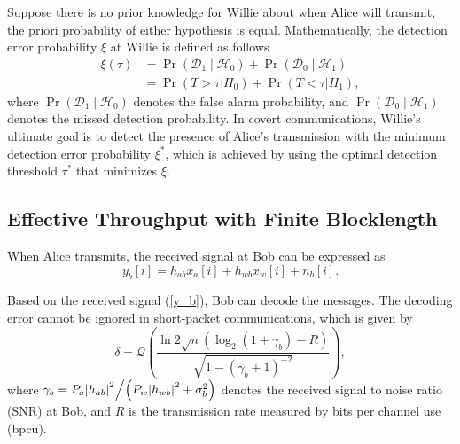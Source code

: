 \documentclass[conference]{IEEEtran}
\begin{document}
Suppose there is no prior knowledge for Willie about when Alice will transmit, the priori probability of either hypothesis is equal. Mathematically,
the detection error probability $\xi$ at Willie is defined as follows \cite{Nmin,Active2,Active3,DF}
\begin{equation}\label{Pd}
	\begin{aligned}
	\xi \left( \tau  \right)&={\Pr}\left(\mathcal{D}_1 \mid \mathcal{H}_0\right)+{\Pr}\left(\mathcal{D}_0 \mid \mathcal{H}_1\right) \\
	&= \Pr \left( {T > \tau |{H_0}} \right) + \Pr \left( {T < \tau |{H_1}} \right),
	\end{aligned}
\end{equation}
where $ {\Pr}\left(\mathcal{D}_1 \mid \mathcal{H}_0\right)$ denotes the false alarm probability, and $ {\Pr}\left(\mathcal{D}_0 \mid \mathcal{H}_1\right)$ denotes the missed detection probability. In covert communications, Willie’s
ultimate goal is to detect the presence of Alice’s transmission
with the minimum detection error probability $\xi^*$, which is
achieved by using the optimal detection threshold $\tau^*$ that minimizes $\xi$.


\subsection{Effective Throughput with Finite Blocklength}
When Alice transmits, the received signal at Bob can be expressed as
\begin{equation}\label{y_b}
	y_b[i]=h_{ab}x_a[i]+{h_{wb}}{x_w}[i]+n_b[i].
\end{equation}

Based on the received signal (\ref{y_b}), Bob can decode the messages. The decoding error cannot be ignored in short-packet communications, which is given by \cite{ECT2}
\begin{equation}\label{Pout}
	\delta=\mathcal{Q}\left(\frac{\ln 2 \sqrt{n}\left(\log _2\left(1+\gamma_b\right)-R\right)}{\sqrt{1-\left(\gamma_b+1\right)^{-2}}}\right),
\end{equation}
where ${\gamma _b} = {{{P_a}{{\left| {{h_{ab}}} \right|}^2}} \mathord{\left/
		{\vphantom {{{P_a}{{\left| {{h_{ab}}} \right|}^2}} {\left( {{P_w}{{\left| {{h_{wb}}} \right|}^2} + \sigma _b^2} \right)}}} \right.
		\kern-\nulldelimiterspace} {\left( {{P_w}{{\left| {{h_{wb}}} \right|}^2} + \sigma _b^2} \right)}}$ denotes the received signal to noise ratio (SNR) at Bob, and $R$ is the transmission rate measured by bits per channel use (bpcu).
\end{document}
